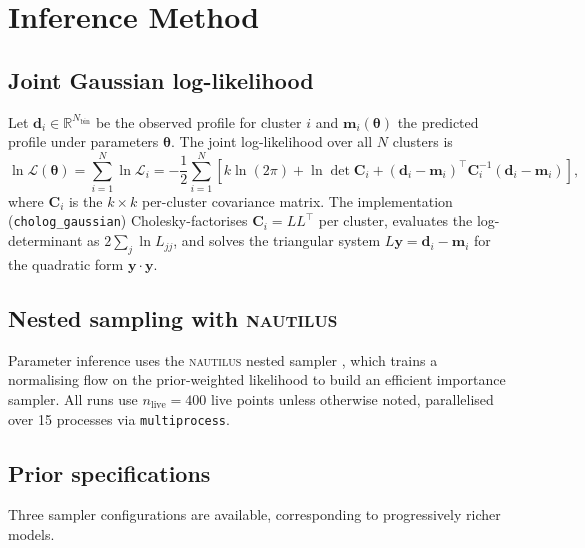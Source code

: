 \documentclass[12pt,a4paper]{article}
\begin{document}
\section{Inference Method}
\label{sec:inference}

\subsection{Joint Gaussian log-likelihood}

Let $\mathbf{d}_i\in\mathbb{R}^{N_\mathrm{bin}}$ be the observed profile for cluster $i$
and $\mathbf{m}_i(\boldsymbol{\theta})$ the predicted profile under parameters
$\boldsymbol{\theta}$.  The joint log-likelihood over all $N$ clusters is
\begin{equation}
  \ln\mathcal{L}(\boldsymbol{\theta}) =
    \sum_{i=1}^N \ln\mathcal{L}_i =
    -\frac{1}{2}\sum_{i=1}^N
    \left[
      k\ln(2\pi)
      + \ln\det\mathbf{C}_i
      + (\mathbf{d}_i - \mathbf{m}_i)^\top \mathbf{C}_i^{-1} (\mathbf{d}_i - \mathbf{m}_i)
    \right],
  \label{eq:loglike}
\end{equation}
where $\mathbf{C}_i$ is the $k\times k$ per-cluster covariance matrix.
The implementation (\texttt{cholog\_gaussian}) Cholesky-factorises $\mathbf{C}_i=LL^\top$
per cluster, evaluates the log-determinant as $2\sum_j\ln L_{jj}$, and solves the
triangular system $L\mathbf{y}=\mathbf{d}_i-\mathbf{m}_i$ for the quadratic form
$\mathbf{y}\cdot\mathbf{y}$.

\subsection{Nested sampling with \textsc{nautilus}}

Parameter inference uses the \textsc{nautilus} nested sampler \citep{nautilus2023},
which trains a normalising flow on the prior-weighted likelihood to build an
efficient importance sampler.  All runs use $n_\mathrm{live}=400$ live points
unless otherwise noted, parallelised over 15 processes via \texttt{multiprocess}.

\subsection{Prior specifications}

Three sampler configurations are available, corresponding to progressively richer models.
\end{document}
